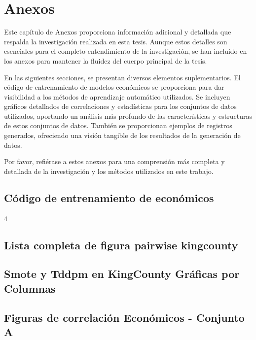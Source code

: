 \chapter{Anexos}
Este capítulo de Anexos proporciona información adicional y detallada que respalda la investigación realizada en esta tesis. Aunque estos detalles son esenciales para el completo entendimiento de la investigación, se han incluido en los anexos para mantener la fluidez del cuerpo principal de la tesis.

En las siguientes secciones, se presentan diversos elementos suplementarios. El código de entrenamiento de modelos económicos se proporciona para dar visibilidad a los métodos de aprendizaje automático utilizados. Se incluyen gráficos detallados de correlaciones y estadísticas para los conjuntos de datos utilizados, aportando un análisis más profundo de las características y estructuras de estos conjuntos de datos. También se proporcionan ejemplos de registros generados, ofreciendo una visión tangible de los resultados de la generación de datos.

Por favor, refiérase a estos anexos para una comprensión más completa y detallada de la investigación y los métodos utilizados en este trabajo.
\section{Código de entrenamiento de económicos}

4
\section{Lista completa de figura pairwise kingcounty}
\label{A-pairwise-kingcounty-top2-a-1}


\section{Smote y Tddpm en KingCounty Gráficas por Columnas}



\section{Figuras de correlación Económicos - Conjunto A}
\label{pairwise-full-a}



